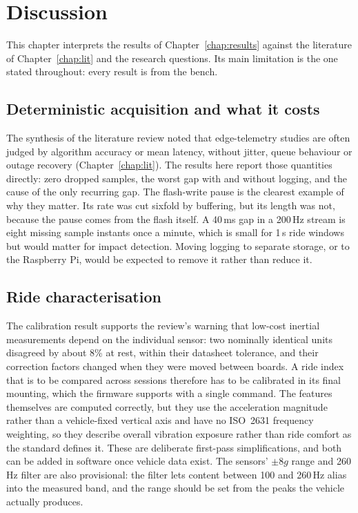 \chapter{Discussion}
\label{chap:discussion}

This chapter interprets the results of Chapter~\ref{chap:results} against the literature of Chapter~\ref{chap:lit} and the research questions. Its main limitation is the one stated throughout: every result is from the bench.

\section{Deterministic acquisition and what it costs}

The synthesis of the literature review noted that edge-telemetry studies are often judged by algorithm accuracy or mean latency, without jitter, queue behaviour or outage recovery (Chapter~\ref{chap:lit}). The results here report those quantities directly: zero dropped samples, the worst gap with and without logging, and the cause of the only recurring gap. The flash-write pause is the clearest example of why they matter. Its rate was cut sixfold by buffering, but its length was not, because the pause comes from the flash itself. A 40\,ms gap in a 200\,Hz stream is eight missing sample instants once a minute, which is small for 1\,s ride windows but would matter for impact detection. Moving logging to separate storage, or to the Raspberry Pi, would be expected to remove it rather than reduce it.

\section{Ride characterisation}

The calibration result supports the review's warning that low-cost inertial measurements depend on the individual sensor: two nominally identical units disagreed by about 8\% at rest, within their datasheet tolerance, and their correction factors changed when they were moved between boards. A ride index that is to be compared across sessions therefore has to be calibrated in its final mounting, which the firmware supports with a single command. The features themselves are computed correctly, but they use the acceleration magnitude rather than a vehicle-fixed vertical axis and have no ISO~2631 frequency weighting, so they describe overall vibration exposure rather than ride comfort as the standard defines it. These are deliberate first-pass simplifications, and both can be added in software once vehicle data exist. The sensors' $\pm8g$ range and 260\,Hz filter are also provisional: the filter lets content between 100 and 260\,Hz alias into the measured band, and the range should be set from the peaks the vehicle actually produces.

